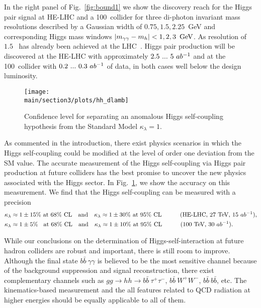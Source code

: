 In the right panel of Fig.~\ref{fig:bound1} we show the discovery reach for 
the Higgs pair signal at HE-LHC and a 100~\UTeV collider for three di-photon 
invariant mass resolutions described by a Gaussian width of 
$0.75,1.5,2.25$~GeV and corresponding Higgs mass windows 
$|m_{\gamma\gamma}-m_h|<1,2,3~\,\text{Ge\hspace{-.08em}V}$. As resolution of $1.5$~\UGeV 
has already been achieved at the LHC~\cite{CMS:2016zjv}. Higgs pair 
production will be discovered at the HE-LHC with approximately 
$2.5~...~5~ab^{-1}$ and at the 100~\UTeV collider with $0.2~...~0.3~ab^{-1}$ 
of data, in both cases well below the design luminosity.

\begin{figure}[t!]
\centering 
  \texttt{[image: \\main/section3/plots/hh\_dlamb]}
  \caption{Confidence level for separating an anomalous Higgs
    self-coupling hypothesis from the Standard Model
    $\kappa_{\lambda}=1$.}
 \label{fig:bound2}
\end{figure}

As commented in the introduction, there exist physics scenarios 
in which the Higgs self-coupling could be modified at the level of order 
one deviation from the SM value. The accurate measurement of the 
Higgs self-coupling via Higgs pair production at future colliders has the 
best promise to uncover the new physics associated with the Higgs sector.
In Fig.~\ref{fig:bound2}, we show the accuracy on this measurement. 
We find that the Higgs self-coupling can be measured with a precision
% 
\begin{align}
\kappa_{\lambda} &\approx 1 \pm 15\% \text{    at 68\% CL}\quad \text{and} \quad
\kappa_{\lambda} \approx 1 \pm 30\%   \text{    at 95\% CL}\quad\quad\quad
\text{(HE-LHC, 27~\ensuremath{\text{TeV}}, $15~ab^{-1}$)}  , \notag \\
\kappa_{\lambda} &\approx 1 \pm 5\% \;\; \text{    at 68\% CL}\quad \text{and}\quad
\kappa_{\lambda} \approx 1 \pm 10\% \text{    at 95\% CL} \quad\quad\quad
\text{(100~\ensuremath{\text{TeV}}, $30~ab^{-1}$).} 
\end{align}

While our conclusions on the determination of Higgs-self-interaction
at future hadron colliders are robust and important, there is still
room to improve. Although the final state $b\bar b\ \gamma\gamma$ is
believed to be the most sensitive channel because of the background
suppression and signal reconstruction, there exist complementary
channels such as ${gg\to hh \to b\bar b\ \tau^+\tau^-}$, $b\bar
b\ W^+W^-$, $b\bar b\ b\bar b$, etc. The kinematics-based measurement
and the all features related to QCD radiation at higher energies
should be equally applicable to all of them.

